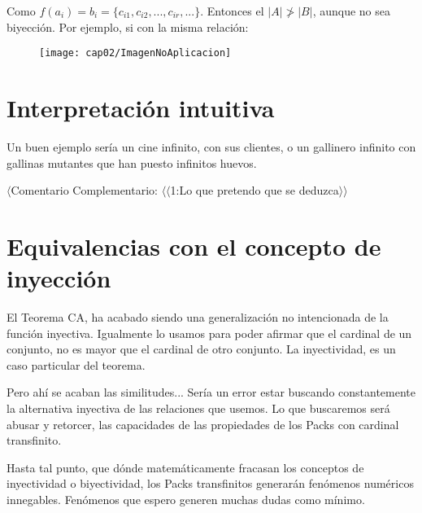 Como $f(a_{i}) = b_{i} = \{c_{i1}, c_{i2}, ... , c_{ir}, ... \}$. Entonces el $|A| \ngtr |B|$, aunque no sea biyección.
\newpage
Por ejemplo, si con la misma relación:
\begin{figure}[h!]
	\texttt{[image: cap02/ImagenNoAplicacion]}
	\centering
\end{figure}










\newpage
\section{Interpretación intuitiva}
Un buen ejemplo sería un cine infinito, con sus clientes, o un gallinero infinito con gallinas mutantes que han puesto infinitos huevos.

$\langle$Comentario Complementario: $\langle\langle$1:Lo que pretendo que se deduzca$\rangle\rangle$

\newpage
\section{Equivalencias con el concepto de inyección}

El Teorema CA, ha acabado siendo una generalización no intencionada de la función inyectiva. Igualmente lo usamos para poder afirmar que el cardinal de un conjunto, no es mayor que el cardinal de otro conjunto. La inyectividad, es un caso particular del teorema.

Pero ahí se acaban las similitudes... Sería un error estar buscando constantemente la alternativa inyectiva de las relaciones que usemos. Lo que buscaremos será abusar y retorcer, las capacidades de las propiedades de los Packs con cardinal transfinito.

Hasta tal punto, que dónde matemáticamente fracasan los conceptos de inyectividad o biyectividad, los Packs transfinitos generarán fenómenos numéricos innegables. Fenómenos que espero generen muchas dudas como mínimo.